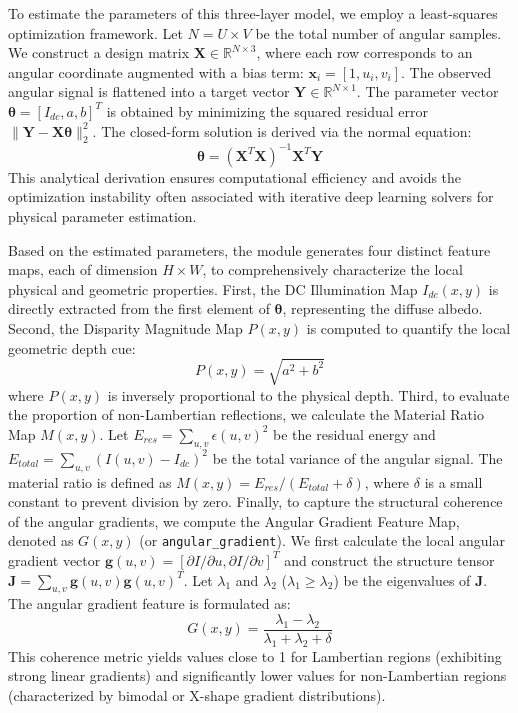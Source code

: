 \documentclass[lettersize,journal]{IEEEtran}
\begin{document}
To estimate the parameters of this three-layer model, we employ a least-squares optimization framework. Let $N = U \times V$ be the total number of angular samples. We construct a design matrix $\mathbf{X} \in \mathbb{R}^{N \times 3}$, where each row corresponds to an angular coordinate augmented with a bias term: $\mathbf{x}_i = [1, u_i, v_i]$. The observed angular signal is flattened into a target vector $\mathbf{Y} \in \mathbb{R}^{N \times 1}$. The parameter vector $\boldsymbol{\theta} = [I_{dc}, a, b]^T$ is obtained by minimizing the squared residual error $\|\mathbf{Y} - \mathbf{X}\boldsymbol{\theta}\|_2^2$. The closed-form solution is derived via the normal equation:
\begin{equation}
\boldsymbol{\theta} = (\mathbf{X}^T \mathbf{X})^{-1} \mathbf{X}^T \mathbf{Y}
\end{equation}
This analytical derivation ensures computational efficiency and avoids the optimization instability often associated with iterative deep learning solvers for physical parameter estimation.

Based on the estimated parameters, the module generates four distinct feature maps, each of dimension $H \times W$, to comprehensively characterize the local physical and geometric properties. First, the DC Illumination Map $I_{dc}(x,y)$ is directly extracted from the first element of $\boldsymbol{\theta}$, representing the diffuse albedo. Second, the Disparity Magnitude Map $P(x,y)$ is computed to quantify the local geometric depth cue:
\begin{equation}
P(x,y) = \sqrt{a^2 + b^2}
\end{equation}
where $P(x,y)$ is inversely proportional to the physical depth. Third, to evaluate the proportion of non-Lambertian reflections, we calculate the Material Ratio Map $M(x,y)$. Let $E_{res} = \sum_{u,v} \epsilon(u,v)^2$ be the residual energy and $E_{total} = \sum_{u,v} (I(u,v) - I_{dc})^2$ be the total variance of the angular signal. The material ratio is defined as $M(x,y) = E_{res} / (E_{total} + \delta)$, where $\delta$ is a small constant to prevent division by zero. Finally, to capture the structural coherence of the angular gradients, we compute the Angular Gradient Feature Map, denoted as $G(x,y)$ (or \texttt{angular\_gradient}). We first calculate the local angular gradient vector $\mathbf{g}(u,v) = [\partial I/\partial u, \partial I/\partial v]^T$ and construct the structure tensor $\mathbf{J} = \sum_{u,v} \mathbf{g}(u,v) \mathbf{g}(u,v)^T$. Let $\lambda_1$ and $\lambda_2$ ($\lambda_1 \ge \lambda_2$) be the eigenvalues of $\mathbf{J}$. The angular gradient feature is formulated as:
\begin{equation}
G(x,y) = \frac{\lambda_1 - \lambda_2}{\lambda_1 + \lambda_2 + \delta}
\end{equation}
This coherence metric yields values close to 1 for Lambertian regions (exhibiting strong linear gradients) and significantly lower values for non-Lambertian regions (characterized by bimodal or X-shape gradient distributions).
\end{document}
